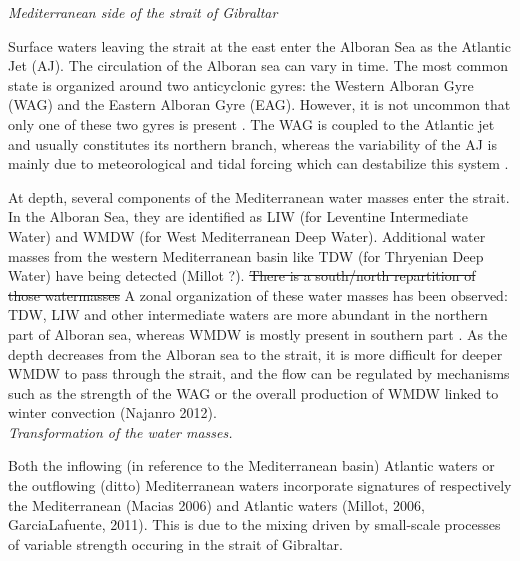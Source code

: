 \color{blue}\textit{Mediterranean side of the strait of Gibraltar} \color{black}


Surface waters leaving the strait at the east enter the Alboran Sea as the Atlantic Jet (AJ). The circulation of the Alboran sea \color{blue}can vary in time\color{blue}. The most common state is organized around two anticyclonic gyres: \color{blue}the Western Alboran Gyre (WAG) and the Eastern Alboran Gyre (EAG)\color{black}. \color{blue}However, it is \color{black} not uncommon that only one of \color{blue}these two gyres \color{blue} is present \citep{millot_2005}. The WAG is coupled to the Atlantic jet \color{blue}and \color{black} usually constitutes its northern branch, \color{blue}whereas the \color{black} variability of the AJ is mainly due to meteorological and tidal forcing which can destabilize this system \citep{sanchez-garrido_2013,lorente_2019}.

At depth, several \color{blue}components of \color{black} the Mediterranean water masses enter the strait. In the Alboran Sea, \color{blue}they are \color{black}identified as LIW (for Leventine Intermediate Water) and WMDW (for West Mediterranean Deep Water). \color{blue} Additional water masses from the western Mediterranean basin \color{blue} like TDW (for Thryenian Deep Water) \color{blue}have \color{black} being detected \color{blue}(Millot ?)\color{black}. \sout{There is a south/north repartition of those watermasses} A zonal organization of these water masses has been observed: TDW, LIW and other intermediate waters are \color{black} more abundant in the northern part of Alboran sea, whereas WMDW  \color{blue}is mostly present \color{black} in southern part \citep{millot_2014}. As the depth decreases from the Alboran sea to the strait, it is more difficult for deeper WMDW to \color{blue}pass through the \color{black} strait, and the flow can be regulated by mechanisms such as the strength of the WAG or the overall production of WMDW linked to winter convection (Najanro 2012).\\


\color{blue}\textit{Transformation of the water masses.} \color{black}

\color{blue}Both the inflowing (in reference to the Mediterranean basin) Atlantic waters or the outflowing (ditto) Mediterranean waters incorporate \color{black} signatures of respectively the Mediterranean (Macias 2006) and Atlantic waters (Millot, 2006, GarciaLafuente, 2011). This is due to the mixing driven by small-scale processes of variable strength \color{blue}occuring in the strait of Gibraltar. \color{black} 


